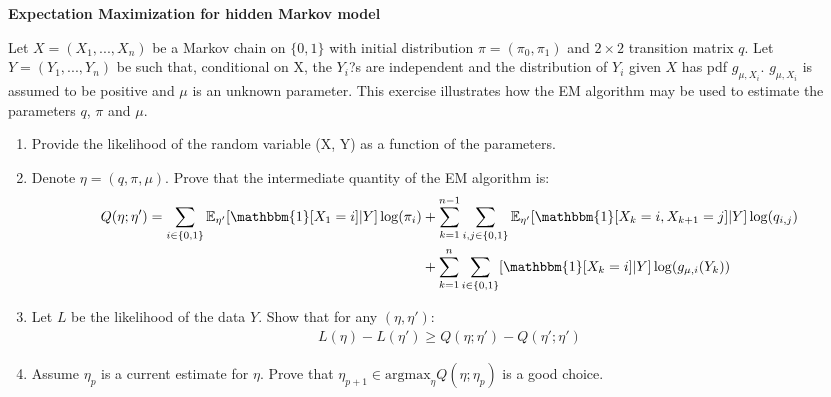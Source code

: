 \documentclass{article}
\begin{document}
\begin{exercise} \textbf{Expectation Maximization for hidden Markov model}

\smallskip

Let $X = (X_1, . . . , X_n)$ be a Markov chain on $\{0,1\}$ with initial distribution $\pi = (\pi_0, \pi_1)$ and $2 \times 2$ transition matrix $q$. Let $Y = (Y_1, . . . , Y_n)$ be such that, conditional on X, the $Y_i$?s are independent and the distribution of $Y_i$ given $X$ has pdf $g_{\mu, X_i}$. $g_{\mu, X_i}$ is assumed to be positive and $\mu$ is an unknown parameter. This exercise illustrates how the EM algorithm may be used to estimate the parameters $q$, $\pi$ and $\mu$.

\begin{enumerate}
\item Provide the likelihood of the random variable (X, Y) as a function of the parameters.
\item Denote $\eta = (q, \pi, \mu)$. Prove that the intermediate quantity of the EM algorithm is:
\begin{align*}
Q(\eta; \eta') = \sum_{i \in \{0, 1\}} \mathbb{E}_{\eta'}[\mathbbm{1}[X_1 = i] | Y] \log(\pi_i) &+ \sum_{k=1}^{n-1} \sum_{i, j \in \{0, 1\}} \mathbb{E}_{\eta'}[\mathbbm{1}[X_k = i, X_{k+1} = j] | Y] \log(q_{i, j})\\ 
&+ \sum_{k=1}^{n} \sum_{i \in \{0, 1\}} [\mathbbm{1}[X_k = i] | Y] \log(g_{\mu, i}(Y_k))
\end{align*}

\item Let $L$ be the likelihood of the data $Y$. Show that for any $(\eta, \eta')$:
\begin{align*}
L(\eta) - L(\eta') \geq Q(\eta; \eta') - Q(\eta'; \eta')
\end{align*}
\item Assume $\eta_p$ is a current estimate for $\eta$. Prove that $\eta_{p+1} \in \textrm{argmax}_{\eta} Q(\eta ; \eta_p)$ is a good choice.
\end{enumerate} 
\end{exercise}

\smallskip
\end{document}

